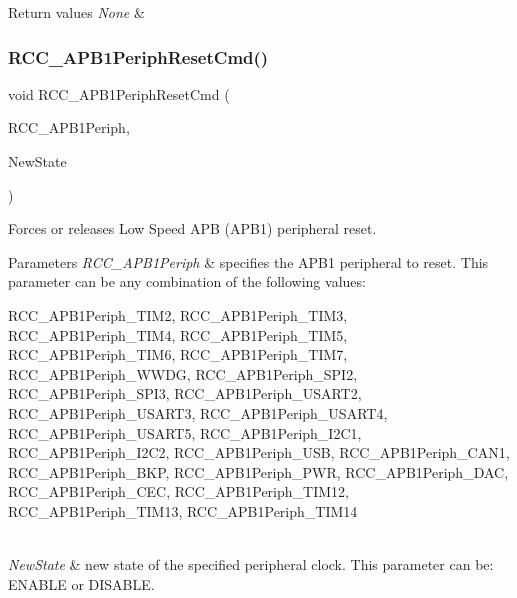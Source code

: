 \begin{DoxyRetVals}{Return values}
{\em None} & \\
\hline
\end{DoxyRetVals}
\mbox{\label{group___r_c_c___exported___functions_gab197ae4369c10b92640a733b40ed2801}} 
\subsubsection{\texorpdfstring{RCC\_APB1PeriphResetCmd()}{RCC\_APB1PeriphResetCmd()}}
{\footnotesize\ttfamily void R\+C\+C\+\_\+\+A\+P\+B1\+Periph\+Reset\+Cmd (\begin{DoxyParamCaption}\item[{uint32\+\_\+t}]{R\+C\+C\+\_\+\+A\+P\+B1\+Periph,  }\item[{\mbox{\hyperlink{group___exported__types_gac9a7e9a35d2513ec15c3b537aaa4fba1}{Functional\+State}}}]{New\+State }\end{DoxyParamCaption})}



Forces or releases Low Speed A\+PB (A\+P\+B1) peripheral reset. 


\begin{DoxyParams}{Parameters}
{\em R\+C\+C\+\_\+\+A\+P\+B1\+Periph} & specifies the A\+P\+B1 peripheral to reset. This parameter can be any combination of the following values\+: \begin{DoxyItemize}
\item R\+C\+C\+\_\+\+A\+P\+B1\+Periph\+\_\+\+T\+I\+M2, R\+C\+C\+\_\+\+A\+P\+B1\+Periph\+\_\+\+T\+I\+M3, R\+C\+C\+\_\+\+A\+P\+B1\+Periph\+\_\+\+T\+I\+M4, R\+C\+C\+\_\+\+A\+P\+B1\+Periph\+\_\+\+T\+I\+M5, R\+C\+C\+\_\+\+A\+P\+B1\+Periph\+\_\+\+T\+I\+M6, R\+C\+C\+\_\+\+A\+P\+B1\+Periph\+\_\+\+T\+I\+M7, R\+C\+C\+\_\+\+A\+P\+B1\+Periph\+\_\+\+W\+W\+DG, R\+C\+C\+\_\+\+A\+P\+B1\+Periph\+\_\+\+S\+P\+I2, R\+C\+C\+\_\+\+A\+P\+B1\+Periph\+\_\+\+S\+P\+I3, R\+C\+C\+\_\+\+A\+P\+B1\+Periph\+\_\+\+U\+S\+A\+R\+T2, R\+C\+C\+\_\+\+A\+P\+B1\+Periph\+\_\+\+U\+S\+A\+R\+T3, R\+C\+C\+\_\+\+A\+P\+B1\+Periph\+\_\+\+U\+S\+A\+R\+T4, R\+C\+C\+\_\+\+A\+P\+B1\+Periph\+\_\+\+U\+S\+A\+R\+T5, R\+C\+C\+\_\+\+A\+P\+B1\+Periph\+\_\+\+I2\+C1, R\+C\+C\+\_\+\+A\+P\+B1\+Periph\+\_\+\+I2\+C2, R\+C\+C\+\_\+\+A\+P\+B1\+Periph\+\_\+\+U\+SB, R\+C\+C\+\_\+\+A\+P\+B1\+Periph\+\_\+\+C\+A\+N1, R\+C\+C\+\_\+\+A\+P\+B1\+Periph\+\_\+\+B\+KP, R\+C\+C\+\_\+\+A\+P\+B1\+Periph\+\_\+\+P\+WR, R\+C\+C\+\_\+\+A\+P\+B1\+Periph\+\_\+\+D\+AC, R\+C\+C\+\_\+\+A\+P\+B1\+Periph\+\_\+\+C\+EC, R\+C\+C\+\_\+\+A\+P\+B1\+Periph\+\_\+\+T\+I\+M12, R\+C\+C\+\_\+\+A\+P\+B1\+Periph\+\_\+\+T\+I\+M13, R\+C\+C\+\_\+\+A\+P\+B1\+Periph\+\_\+\+T\+I\+M14\end{DoxyItemize}
\\
\hline
{\em New\+State} & new state of the specified peripheral clock. This parameter can be\+: E\+N\+A\+B\+LE or D\+I\+S\+A\+B\+LE. \\
\hline
\end{DoxyParams}

